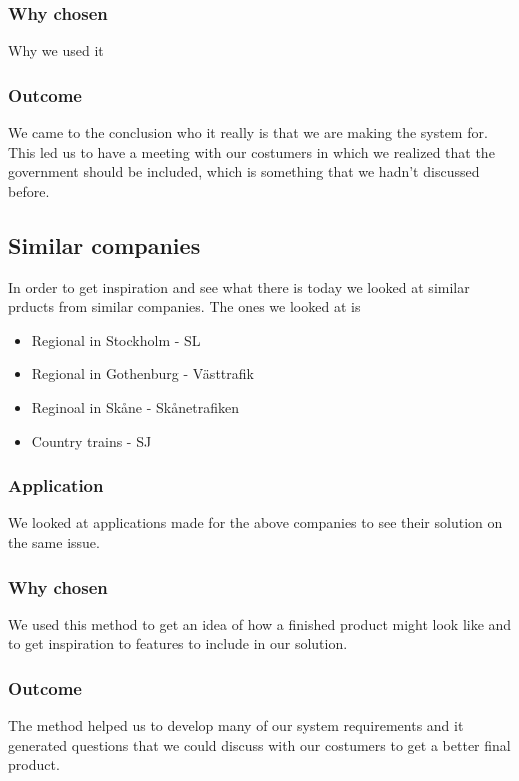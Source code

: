 \documentclass[a4paper]{article}
\begin{document}
    \subsubsection{Why chosen}
    Why we used it
    \subsubsection{Outcome}
    We came to the conclusion who it really is that we are making the system for. This led us to have a meeting with our costumers in which we realized that the government should be included, which is something that we hadn't discussed before.
    
    
    \subsection{Similar companies}

    In order to get inspiration and see what there is today we looked at similar prducts from similar companies.
    The ones we looked at is

	\begin{itemize}
		\item Regional in Stockholm - SL
		\item Regional in Gothenburg - Västtrafik
		\item Reginoal in Skåne - Skånetrafiken
		\item Country trains - SJ
	\end{itemize}
    
    \subsubsection{Application}
    We looked at applications made for the above companies to see their solution on the same issue.
    \subsubsection{Why chosen}
    We used this method to get an idea of how a finished product might look like and to get inspiration to features to include in our solution.
    \subsubsection{Outcome}
    The method helped us to develop many of our system requirements and it generated questions that we could discuss with our costumers to get a better final product. 
\end{document}
